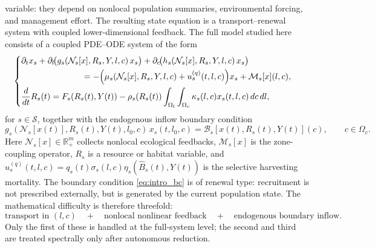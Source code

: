 \documentclass[pdflatex,sn-mathphys-num]{sn-jnl}%
\begin{document}
variable: they depend on nonlocal population summaries, environmental forcing, and
management effort. The resulting state equation is a transport--renewal system with
coupled lower-dimensional feedback.
The full model studied here consists of a coupled PDE--ODE system of the form
\begin{equation}\label{eq:intro_state}
\begin{cases}
\displaystyle
\partial_t x_s
+\partial_l\!\big(g_s(\mathcal N_s[x],R_s,Y,l,c)\,x_s\big)
+\partial_c\!\big(h_s(\mathcal N_s[x],R_s,Y,l,c)\,x_s\big)
\\[1mm]
\hspace{2.6cm}
=
-\Big(\mu_s(\mathcal N_s[x],R_s,Y,l,c)+u_s^{(q)}(t,l,c)\Big)x_s
+\mathcal M_s[x](l,c),
\\[2mm]
\displaystyle
\frac{d}{dt}R_s(t)
=
F_s(R_s(t),Y(t))
-\rho_s(R_s(t))
\int_{\Omega_l}\int_{\Omega_c}\kappa_s(l,c)x_s(t,l,c)\,dc\,dl,
\end{cases}
\end{equation}
for \(s\in\mathcal S\), together with the endogenous inflow boundary condition
\begin{equation}\label{eq:intro_bc}
g_s(\mathcal N_s[x(t)],R_s(t),Y(t),l_0,c)\,x_s(t,l_0,c)
=
\mathcal B_s[x(t),R_s(t),Y(t)](c),
\qquad c\in\Omega_c.
\end{equation}
Here
\(\mathcal N_s[x]\in\mathbb R_+^m\)
collects nonlocal ecological feedbacks,
\(\mathcal M_s[x]\)
is the zone-coupling operator,
\(R_s\)
is a resource or habitat variable,
and
\(u_s^{(q)}(t,l,c)=q_s(t)\sigma_s(l,c)\eta_s(\widehat B_s(t),Y(t))\)
is the selective harvesting mortality. The boundary condition
\eqref{eq:intro_bc} is of renewal type: recruitment is not prescribed externally, but
is generated by the current population state.
The mathematical difficulty is therefore threefold:
\begin{equation}\label{eq:intro_difficulties}
\text{transport in }(l,c)
\quad+\quad
\text{nonlocal nonlinear feedback}
\quad+\quad
\text{endogenous boundary inflow}.
\end{equation}
Only the first of these is handled at the full-system level; the second and third are
treated spectrally only after autonomous reduction.
\end{document}
